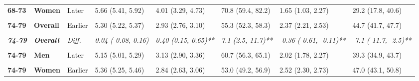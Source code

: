 \begin{table}[!h]
{{\begin{tabular}[t]{>{}l>{}lllllll}
\cmidrule{1-8}
\textbf{68-73} & \textbf{Women} & Later & 5.66 (5.41, 5.92) & 4.01 (3.29, 4.73) & 70.8 (59.4, 82.2) & 1.65 (1.03, 2.27) & 29.2 (17.8, 40.6)\\
\cmidrule{1-8}
\em{\textbf{\cellcolor{gray!10}{68-73}}} & \em{\textbf{\cellcolor{gray!10}{Women}}} & \em{\cellcolor{gray!10}{Diff.}} & \em{\cellcolor{gray!10}{0.06 (-0.21, 0.33)}} & \em{\cellcolor{gray!10}{0.89 (0.14, 1.65)*}} & \em{\cellcolor{gray!10}{15.2 (3.1, 27.3)*}} & \em{\cellcolor{gray!10}{-0.83 (-1.50, -0.17)*}} & \em{\cellcolor{gray!10}{-15.2 (-27.3, -3.1)*}}\\
\cmidrule{1-8}
\textbf{74-79} & \textbf{Overall} & Earlier & 5.30 (5.22, 5.37) & 2.93 (2.76, 3.10) & 55.3 (52.3, 58.3) & 2.37 (2.21, 2.53) & 44.7 (41.7, 47.7)\\
\cmidrule{1-8}
\textbf{\cellcolor{gray!10}{74-79}} & \textbf{\cellcolor{gray!10}{Overall}} & \cellcolor{gray!10}{Later} & \cellcolor{gray!10}{5.34 (5.25, 5.43)} & \cellcolor{gray!10}{3.33 (3.14, 3.52)} & \cellcolor{gray!10}{62.4 (58.9, 65.9)} & \cellcolor{gray!10}{2.01 (1.82, 2.20)} & \cellcolor{gray!10}{37.6 (34.1, 41.1)}\\
\cmidrule{1-8}
\em{\textbf{74-79}} & \em{\textbf{Overall}} & \em{Diff.} & \em{0.04 (-0.08, 0.16)} & \em{0.40 (0.15, 0.65)**} & \em{7.1 (2.5, 11.7)**} & \em{-0.36 (-0.61, -0.11)**} & \em{-7.1 (-11.7, -2.5)**}\\
\cmidrule{1-8}
\textbf{\cellcolor{gray!10}{74-79}} & \textbf{\cellcolor{gray!10}{Men}} & \cellcolor{gray!10}{Earlier} & \cellcolor{gray!10}{5.23 (5.12, 5.34)} & \cellcolor{gray!10}{3.03 (2.83, 3.23)} & \cellcolor{gray!10}{57.9 (54.3, 61.5)} & \cellcolor{gray!10}{2.20 (2.01, 2.40)} & \cellcolor{gray!10}{42.1 (38.5, 45.7)}\\
\cmidrule{1-8}
\textbf{74-79} & \textbf{Men} & Later & 5.15 (5.01, 5.29) & 3.13 (2.90, 3.36) & 60.7 (56.3, 65.1) & 2.02 (1.78, 2.27) & 39.3 (34.9, 43.7)\\
\cmidrule{1-8}
\em{\textbf{\cellcolor{gray!10}{74-79}}} & \em{\textbf{\cellcolor{gray!10}{Men}}} & \em{\cellcolor{gray!10}{Diff.}} & \em{\cellcolor{gray!10}{-0.08 (-0.26, 0.10)}} & \em{\cellcolor{gray!10}{0.10 (-0.20, 0.40)}} & \em{\cellcolor{gray!10}{2.8 (-2.9, 8.5)}} & \em{\cellcolor{gray!10}{-0.18 (-0.49, 0.13)}} & \em{\cellcolor{gray!10}{-2.8 (-8.5, 2.9)}}\\
\cmidrule{1-8}
\textbf{74-79} & \textbf{Women} & Earlier & 5.36 (5.25, 5.46) & 2.84 (2.63, 3.06) & 53.0 (49.2, 56.9) & 2.52 (2.30, 2.73) & 47.0 (43.1, 50.8)\\
\cmidrule{1-8}

\end{tabular}}}
\end{table}
